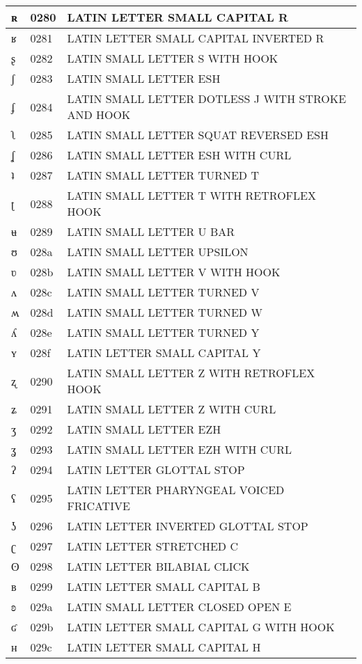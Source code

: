 \documentclass[12pt,letterpaper,openany]{book}
\begin{document}
\begin{center}
\begin{supertabular}{|m{0.25in}|m{0.5in}|m{4in}|}
ʀ & 0280 & LATIN LETTER SMALL CAPITAL R\\\hline
ʁ & 0281 & LATIN LETTER SMALL CAPITAL INVERTED R\\\hline
ʂ & 0282 & LATIN SMALL LETTER S WITH HOOK\\\hline
ʃ & 0283 & LATIN SMALL LETTER ESH\\\hline
ʄ & 0284 & LATIN SMALL LETTER DOTLESS J WITH STROKE AND HOOK\\\hline
ʅ & 0285 & LATIN SMALL LETTER SQUAT REVERSED ESH\\\hline
ʆ & 0286 & LATIN SMALL LETTER ESH WITH CURL\\\hline
ʇ & 0287 & LATIN SMALL LETTER TURNED T\\\hline
ʈ & 0288 & LATIN SMALL LETTER T WITH RETROFLEX HOOK\\\hline
ʉ & 0289 & LATIN SMALL LETTER U BAR\\\hline
ʊ & 028a & LATIN SMALL LETTER UPSILON\\\hline
ʋ & 028b & LATIN SMALL LETTER V WITH HOOK\\\hline
ʌ & 028c & LATIN SMALL LETTER TURNED V\\\hline
ʍ & 028d & LATIN SMALL LETTER TURNED W\\\hline
ʎ & 028e & LATIN SMALL LETTER TURNED Y\\\hline
ʏ & 028f & LATIN LETTER SMALL CAPITAL Y\\\hline
ʐ & 0290 & LATIN SMALL LETTER Z WITH RETROFLEX HOOK\\\hline
ʑ & 0291 & LATIN SMALL LETTER Z WITH CURL\\\hline
ʒ & 0292 & LATIN SMALL LETTER EZH\\\hline
ʓ & 0293 & LATIN SMALL LETTER EZH WITH CURL\\\hline
ʔ & 0294 & LATIN LETTER GLOTTAL STOP\\\hline
ʕ & 0295 & LATIN LETTER PHARYNGEAL VOICED FRICATIVE\\\hline
ʖ & 0296 & LATIN LETTER INVERTED GLOTTAL STOP\\\hline
ʗ & 0297 & LATIN LETTER STRETCHED C\\\hline
ʘ & 0298 & LATIN LETTER BILABIAL CLICK\\\hline
ʙ & 0299 & LATIN LETTER SMALL CAPITAL B\\\hline
ʚ & 029a & LATIN SMALL LETTER CLOSED OPEN E\\\hline
ʛ & 029b & LATIN LETTER SMALL CAPITAL G WITH HOOK\\\hline
ʜ & 029c & LATIN LETTER SMALL CAPITAL H\\\hline

\end{supertabular}
\end{center}
\end{document}
